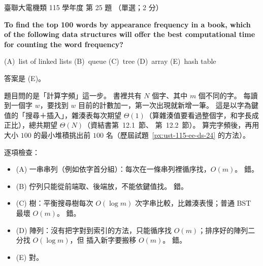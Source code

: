 \begin{pastexam}[label={px:ust-115-ee-ds-25}]{臺聯大電機類 115 學年度 第 25 題}
（單選；2 分）

\textbf{To find the top 100 words by appearance frequency in a book, which of the following data
structures will offer the best computational time for counting the word frequency?}

(A)~list of linked lists \qquad (B)~queue \qquad (C)~tree \qquad (D)~array \qquad (E)~hash table
\end{pastexam}

\begin{pastsoln}
答案是 (E)。

題目問的是「計算字頻」這一步。 書裡共有 $N$ 個字、其中 $m$ 個不同的字。 每讀到一個字 $w$，要找到
$w$ 目前的計數加一，第一次出現就新增一筆。 這是以字為鍵值的「搜尋＋插入」，雜湊表每次期望
$\Theta(1)$（算雜湊值要看過整個字，和字長成正比），總共期望 $\Theta(N)$（資結書第~12.1~節、
第~12.2~節）。 算完字頻後，再用大小 $100$ 的最小堆積挑出前 $100$ 名（歷屆試題~\ref{px:ust-115-ee-ds-24}
的方法）。

逐項檢查：
\begin{itemize}
\item (A) 一串串列（例如依字首分組）：每次在一條串列裡循序找，$O(m)$。 錯。
\item (B) 佇列只能從前端取、後端放，不能依鍵值找。 錯。
\item (C) 樹：平衡搜尋樹每次 $O(\log m)$ 次字串比較，比雜湊表慢；普通 BST 最壞 $O(m)$。 錯。
\item (D) 陣列：沒有把字對到索引的方法，只能循序找 $O(m)$；排序好的陣列二分找 $O(\log m)$，但
插入新字要搬移 $O(m)$。 錯。
\item (E) 對。
\end{itemize}
\end{pastsoln}
